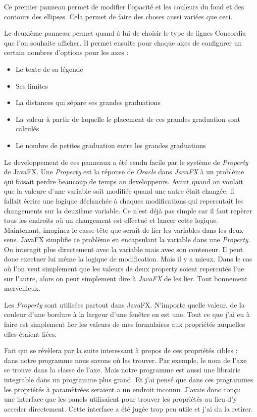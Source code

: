 Ce premier panneau permet de modifier l'opacité et les couleurs du fond et des contours des ellipses. Cela permet de faire des choses aussi variées que ceci.


Le deuxième panneau permet quand à lui de choisir le type de lignes Concordia que l'on souhaite afficher. Il permet ensuite pour chaque axes de configurer un certain nombres d'options pour les axes : 
\begin{itemize}
\item Le texte de sa légende
\item Ses limites
\item La distances qui sépare ses grandes graduations
\item La valeur à partir de laquelle le placement de ces grandes graduation sont calculés
\item Le nombre de petites graduation entre les grandes graduations
\end{itemize}

Le developpement de ces panneaux a été rendu facile par le système de \textit{Property} de JavaFX. Une \textit{Property} est la réponse de \textit{Oracle} dans \textit{JavaFX} à un problème qui faisait perdre beaucoup de temps au developpeurs. Avant quand on voulait que la valeure d'une variable soit modifiée quand une autre était changée, il fallait écrire une logique déclanchée à chaques modifications qui repercutait les changements sur la deuxième variable. Ce n'est déjà pas simple car il faut repèrer tous les endroits où un changement est effectué et lancer cette logique. Maintenant, imaginez le casse-tête que serait de lier les variables dans les deux sens. JavaFX simplifie ce problème en encapsulant la variable dans une \textit{Property}. On interagit plus directement avec la variable mais avec son conteneur. Il peut donc exectuer lui même la logique de modification. Mais il y a mieux. Dans le cas où l'on veut simplement que les valeurs de deux property soient repercutés l'ue sur l'autre, alors on peut simplement dire à \textit{JavaFX} de les lier. Tout bonnement merveilleux.

Les \textit{Property} sont utilisées partout dans JavaFX. N'importe quelle valeur, de la couleur d'une bordure à la largeur d'une fenêtre en est une. Tout ce que j'ai eu à faire est simplement lier les valeurs de mes formulaires aux propriétés auquelles elles étaient liées. 

Fait qui se révèlera par la suite interessant à propos de ces propriétés cibles : dans notre programme nous savons où les trouver. Par exemple, le nom de l'axe se trouve dans la classe de l'axe. Mais notre programme est aussi une librairie integrable dans un programme plus grand. Et j'ai pensé que dans ces programmes les propriétés à paramètrées seraient a un endroit inconnu. J'avais donc conçu une interface que les panels utilisaient pour trouver les propriétés au lieu d'y acceder directement. Cette interface a été jugée trop peu utile et j'ai du la retirer.
